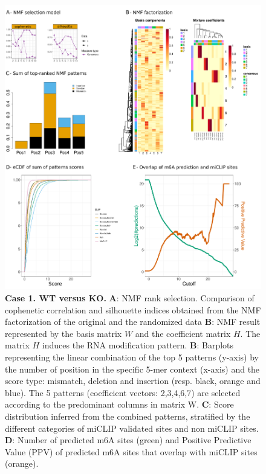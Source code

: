 \documentclass[times, 11pt, a4paper]{article}
\begin{document}
\begin{figure}[h!]
	\includegraphics[width = 1\textwidth]{img/res_wt_ko.pdf}
	\caption{\textbf{Case 1. WT  versus KO.}  \textbf{A}: NMF rank selection. Comparison of cophenetic correlation and silhouette indices obtained from the NMF factorization of the original and the randomized data \textbf{B}: NMF result represented by the basis matrix $W$ and the coefficient matrix $H$. The matrix $H$ induces the RNA modification pattern. \textbf{B}: Barplots representing the linear combination of the top 5 patterns (y-axis) by the number of position in the specific 5-mer context (x-axis) and the score type: mismatch, deletion and insertion (resp. black, orange and blue). The 5 patterns (coefficient vectors: 2,3,4,6,7) are selected according to the predominant columns in matrix W.  \textbf{C}: Score distribution inferred from the combined patterns, stratified by the different categories of miCLIP validated sites and non miCLIP sites.  \textbf{D}: Number of predicted m6A sites (green) and Positive Predictive Value (PPV) of predicted m6A sites that overlap with miCLIP sites (orange). }
	\label{fig:WT_KO}
\end{figure}
\end{document}
